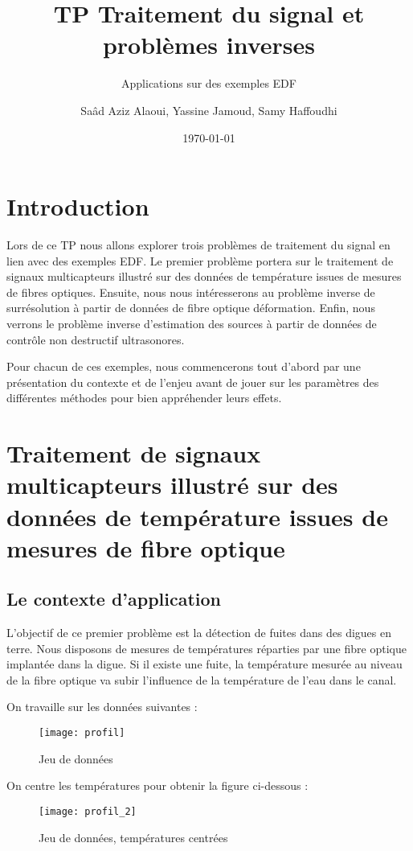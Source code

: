\documentclass[12pt,a4paper,titlepage]{scrartcl}
\title{TP Traitement du signal et problèmes inverses}
\subtitle{Applications sur des exemples EDF}
\author{Saâd Aziz Alaoui, Yassine Jamoud, Samy Haffoudhi}
\date{\today}
\begin{document}
\maketitle

\section*{Introduction}

Lors de ce TP nous allons explorer trois problèmes de traitement
du signal en lien avec des exemples EDF. Le premier problème portera
sur le traitement de signaux multicapteurs illustré sur des données
de température issues de mesures de fibres optiques. Ensuite, nous
nous intéresserons au problème inverse de surrésolution à partir de
données de fibre optique déformation. Enfin, nous verrons le
problème inverse d'estimation des sources à partir de données
de contrôle non destructif ultrasonores.

Pour chacun de ces exemples,
nous commencerons tout d'abord par une présentation du contexte et
de l'enjeu avant de jouer sur les paramètres des différentes méthodes
pour bien appréhender leurs effets.

\section{Traitement de signaux multicapteurs illustré sur des données
de température issues de mesures de fibre optique}

\subsection{Le contexte d'application}

L'objectif de ce premier problème est la détection de fuites dans des digues en terre.
Nous disposons de mesures de températures réparties par une fibre optique
implantée dans la digue. Si il existe une fuite, la température mesurée au niveau de la
fibre optique va subir l'influence de la température de l'eau dans le canal.

On travaille sur les données suivantes :

\begin{figure}[H]
    \caption{Jeu de données}
    \texttt{[image: profil]}
    \centering
\end{figure}

On centre les températures pour obtenir la figure ci-dessous :

\begin{figure}[H]
    \caption{Jeu de données, températures centrées}
    \texttt{[image: profil\_2]}
    \centering
\end{figure}
\end{document}
